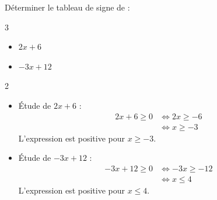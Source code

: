 \begin{methode}
	Déterminer le tableau de signe de :
	\begin{multicols}{3}
		\begin{itemize}
			\item $2x + 6$
			\item $-3x + 12$
		\end{itemize}
	\end{multicols}
	\begin{correction}
		\nline
		\begin{multicols}{2}
			\begin{itemize}
				\item {Étude de $2x + 6$ :}
				      \[
					      \begin{aligned}
						      2x + 6 \ge 0 & \iff 2x \ge -6 \\
						                   & \iff x \ge -3
					      \end{aligned}
				      \]
				      L'expression est positive pour $x \ge -3$.

				      \begin{center}
				      \end{center}

				\item {Étude de $-3x + 12$ :}
				      \[
					      \begin{aligned}
						      -3x + 12 \ge 0 & \iff -3x \ge -12 \\
						                     & \iff x \le 4
					      \end{aligned}
				      \]
				      L'expression est positive pour $x \le 4$.

				      \begin{center}
				      \end{center}
			\end{itemize}
		\end{multicols}
	\end{correction}
\end{methode}


